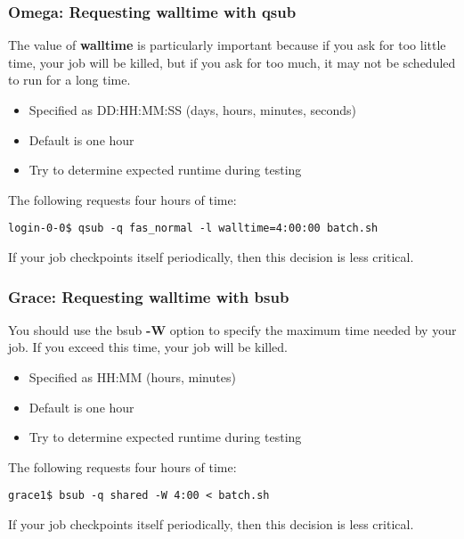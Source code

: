 \documentclass[10pt]{beamer}
\begin{document}
\begin{frame}[fragile]
\frametitle{Omega: Requesting walltime with qsub}
The value of \textbf{walltime} is particularly important because if you
ask for too little time, your job will be killed, but if you ask for too
much, it may not be scheduled to run for a long time.

\begin{itemize}
\item Specified as DD:HH:MM:SS (days, hours, minutes, seconds)
\item Default is one hour
\item Try to determine expected runtime during testing
\end{itemize}

The following requests four hours of time:

\begin{verbatim}
login-0-0$ qsub -q fas_normal -l walltime=4:00:00 batch.sh
\end{verbatim}

If your job checkpoints itself periodically, then this decision is
less critical.
\end{frame}

\begin{frame}[fragile]
\frametitle{Grace: Requesting walltime with bsub}
You should use the bsub \textbf{-W} option to specify the maximum time
needed by your job. If you exceed this time, your job will be killed.

\begin{itemize}
\item Specified as HH:MM (hours, minutes)
\item Default is one hour
\item Try to determine expected runtime during testing
\end{itemize}

The following requests four hours of time:

\begin{verbatim}
grace1$ bsub -q shared -W 4:00 < batch.sh
\end{verbatim}

If your job checkpoints itself periodically, then this decision is
less critical.
\end{frame}
\end{document}
